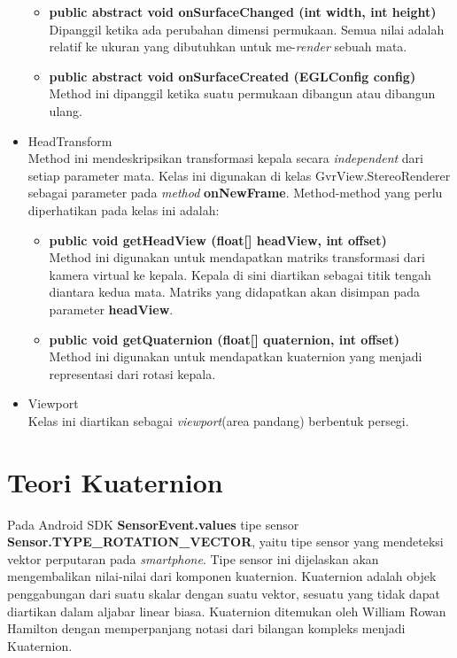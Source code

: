\begin{itemize}
\begin{itemize}
	\item \textbf{public abstract void onSurfaceChanged (int width, int height)}\\
	Dipanggil ketika ada perubahan dimensi permukaan. Semua nilai adalah relatif ke ukuran yang dibutuhkan untuk me-\textit{render} sebuah mata.
	\item \textbf{public abstract void onSurfaceCreated (EGLConfig config)}\\
	Method ini dipanggil ketika suatu permukaan dibangun atau dibangun ulang.
\end{itemize}
\item HeadTransform\\
	Method ini mendeskripsikan transformasi kepala secara \textit{independent} dari setiap parameter mata. Kelas ini digunakan di kelas GvrView.StereoRenderer sebagai parameter pada \textit{method} \textbf{onNewFrame}. Method-method yang perlu diperhatikan pada kelas ini adalah:
	\begin{itemize}
		\item \textbf{public void getHeadView (float[] headView, int offset)}\\
		Method ini digunakan untuk mendapatkan matriks transformasi dari kamera virtual ke kepala. Kepala di sini diartikan sebagai titik tengah diantara kedua mata. Matriks yang didapatkan akan disimpan pada parameter \textbf{headView}.
		\item \textbf{public void getQuaternion (float[] quaternion, int offset)}\\
		Method ini digunakan untuk mendapatkan kuaternion yang menjadi representasi dari rotasi kepala.
	\end{itemize}
	\item Viewport\\
	Kelas ini diartikan sebagai \textit{viewport}(area pandang) berbentuk persegi.
\end{itemize}
\section{Teori Kuaternion}
\label{sec:teori_quaternion}

Pada Android SDK \textbf{SensorEvent.values}  tipe sensor \textbf{Sensor.TYPE\_ROTATION\_VECTOR}, yaitu tipe sensor yang mendeteksi vektor perputaran pada \textit{smartphone}.\cite{android_developers} Tipe sensor ini dijelaskan akan mengembalikan nilai-nilai dari komponen kuaternion. 
Kuaternion adalah objek penggabungan dari suatu skalar dengan suatu vektor, sesuatu yang tidak dapat diartikan dalam aljabar linear biasa.\cite{kuipers:1999} Kuaternion ditemukan oleh William Rowan Hamilton dengan memperpanjang notasi dari bilangan kompleks menjadi Kuaternion. 
